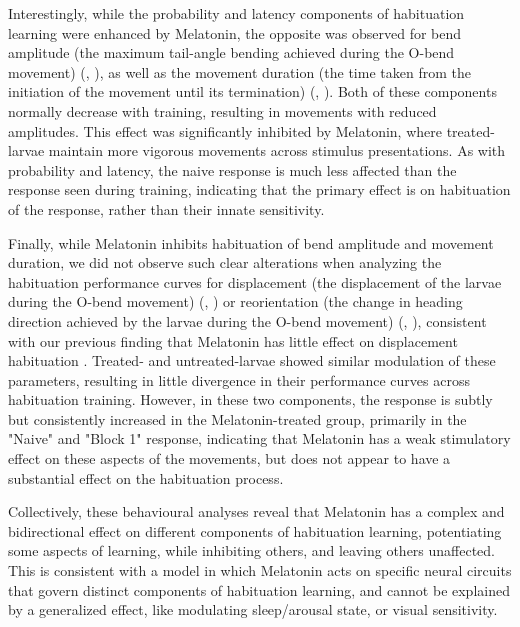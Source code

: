 \documentclass[9.5pt]{RandlettLab_elife}            %
\begin{document}
Interestingly, while the probability and latency components of habituation learning were enhanced by Melatonin, the opposite was observed for bend amplitude (the maximum tail-angle bending achieved during the O-bend movement) (, ), as well as the movement duration (the time taken from the initiation of the movement until its termination) (, ). 
Both of these components normally decrease with training, resulting in movements with reduced amplitudes. 
This effect was significantly inhibited by Melatonin, where treated-larvae maintain more vigorous movements across stimulus presentations. 
As with probability and latency, the naive response is much less affected than the response seen during training, indicating that the primary effect is on habituation of the response, rather than their innate sensitivity.


Finally, while Melatonin inhibits habituation of bend amplitude and movement duration, we did not observe such clear alterations when analyzing the habituation performance curves for displacement (the displacement of the larvae during the O-bend movement) (, ) or reorientation (the change in heading direction achieved by the larvae during the O-bend movement) (, ), consistent with our previous finding that Melatonin has little effect on displacement habituation \citep{Lamire2023-he}. 
Treated- and untreated-larvae showed similar modulation of these parameters, resulting in little divergence in their performance curves across habituation training.
However, in these two components, the response is subtly but consistently increased in the Melatonin-treated group, primarily in the "Naive" and "Block 1" response, indicating that Melatonin has a weak stimulatory effect on these aspects of the movements, but does not appear to have a substantial effect on the habituation process.

Collectively, these behavioural analyses reveal that Melatonin has a complex and bidirectional effect on different components of habituation learning, potentiating some aspects of learning, while inhibiting others, and leaving others unaffected. 
This is consistent with a model in which Melatonin acts on specific neural circuits that govern distinct components of habituation learning, and cannot be explained by a generalized effect, like modulating sleep/arousal state, or visual sensitivity.
\end{document}
